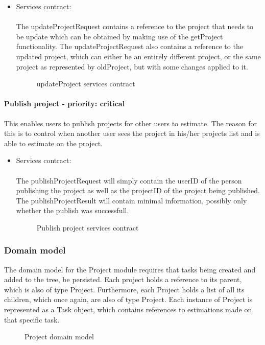 \begin{itemize}
	\item Services contract:\\ \\
	The updateProjectRequest contains a reference to the project that needs to be update which can be obtained by making use of the getProject functionality. The updateProjectRequest also contains a reference to the updated project, which can either be an entirely different project, or the same project as represented by oldProject, but with some changes applied to it.
	\begin{figure}[H]
    	\centering
    	\caption{updateProject services contract}
    	\label{fig:updateProject_services_contract}
   	\end{figure}
\end{itemize}

\paragraph{Publish project - priority: critical}
This enables users to publish projects for other users to estimate. The reason for this is to control when another user sees the project in his/her projects list and is able to estimate on the project.

\begin{itemize}
	\item Services contract:\\ \\
	The publishProjectRequest will simply contain the userID of the person publishing the project as well as the projectID of the project being published. The publishProjectResult will contain minimal information, possibly only whether the publish was successfull.
	\begin{figure}[H]
    	\centering
    	\caption{Publish project services contract}
    	\label{fig:publishProject}
   	\end{figure}
\end{itemize}

\subsubsection{Domain model}
The domain model for the Project module requires that tasks being created and added to the tree, be persisted. Each project holds a reference to its parent, which is also of type Project. Furthermore, each Project holds a list of all its children, which once again, are also of type Project. Each instance of Project is represented as a Task object, which contains references to estimations made on that specific task.
\begin{figure}[H]
	\centering
	\caption{Project domain model}
	\label{fig:Project_domain_model}
\end{figure}
